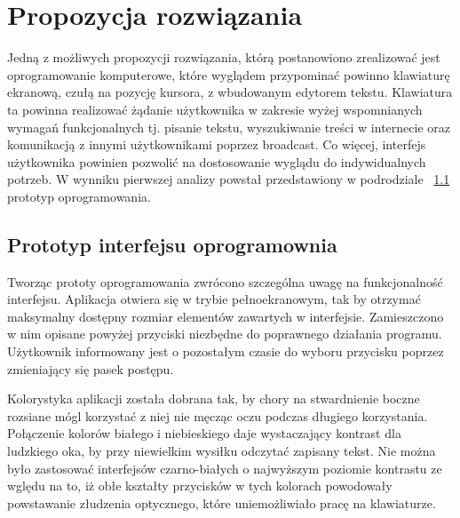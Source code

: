 \documentclass[twoside,a4paper]{book}
\begin{document}
\section{Propozycja rozwiązania}
Jedną z możliwych propozycji rozwiązania, którą postanowiono zrealizować jest oprogramowanie komputerowe, które wyglądem przypominać powinno klawiaturę ekranową, czułą na pozycję kursora, z wbudowanym edytorem tekstu. Klawiatura ta powinna realizować żądanie użytkownika w zakresie wyżej wspomnianych wymagań funkcjonalnych tj. pisanie tekstu, wyszukiwanie treści w internecie oraz komunikacją z innymi użytkownikami poprzez broadcast. Co więcej, interfejs użytkownika powinien pozwolić na dostosowanie wyglądu do indywidualnych potrzeb. W wynniku pierwszej analizy powstał przedstawiony w podrodziale ~\ref{sec:key} prototyp oprogramowania. 
\subsection{Prototyp interfejsu oprogramownia}\label{sec:key}
Tworząc prototy oprogramowania zwrócono szczególna uwagę na funkcjonalność interfejsu. Aplikacja otwiera się w trybie pełnoekranowym, tak by otrzymać maksymalny dostępny rozmiar elementów zawartych w interfejsie. Za\-mie\-szczo\-no w nim opisane powyżej przyciski niezbędne do poprawnego działania programu. Użytkownik informowany jest o pozostałym czasie do wyboru przycisku poprzez zmieniający się pasek postępu. 

Kolorystyka aplikacji została dobrana tak, by chory na stwardnienie boczne rozsiane mógl korzystać z niej nie męcząc oczu podczas długiego korzystania. Połączenie kolorów bia\-łe\-go i niebieskiego daje wystaczający kontrast dla ludzkiego oka, by przy niewielkim wysiłku odczytać zapisany tekst. Nie można było zastosować interfejsów czarno-białych o najwyższym poziomie kontrastu ze wględu na to, iż obłe kształty przycisków w tych kolorach powodowały powstawanie złudzenia optycznego, które uniemożliwiało pracę na klawiaturze. 
\end{document}
